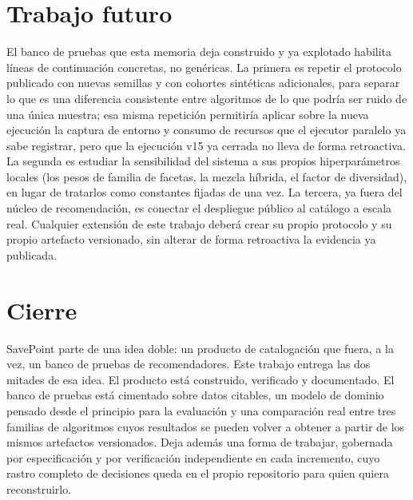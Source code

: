 \section{Trabajo futuro}\label{sec:conc-trabajo-futuro}

El banco de pruebas que esta memoria deja construido y ya explotado habilita líneas de
continuación concretas, no genéricas. La primera es repetir el protocolo publicado con nuevas
semillas y con cohortes sintéticas adicionales, para separar lo que es una diferencia
consistente entre algoritmos de lo que podría ser ruido de una única muestra; esa misma
repetición permitiría aplicar sobre la nueva ejecución la captura de entorno y consumo de
recursos que el ejecutor paralelo ya sabe registrar, pero que la ejecución v15 ya cerrada no
lleva de forma retroactiva. La segunda es estudiar la sensibilidad del sistema a sus propios
hiperparámetros locales (los pesos de familia de facetas, la mezcla híbrida, el factor de
diversidad), en lugar de tratarlos como constantes fijadas de una vez. La tercera, ya fuera
del núcleo de recomendación, es conectar el despliegue público al catálogo a escala real.
Cualquier extensión de este trabajo deberá crear su propio protocolo y su propio artefacto
versionado, sin alterar de forma retroactiva la evidencia ya publicada.

\section{Cierre}\label{sec:conc-cierre}

SavePoint parte de una idea doble: un producto de catalogación que fuera, a la vez, un banco
de pruebas de recomendadores. Este trabajo entrega las dos mitades de esa idea. El producto
está construido, verificado y documentado. El banco de pruebas está cimentado sobre datos
citables, un modelo de dominio pensado desde el principio para la evaluación y una comparación
real entre tres familias de algoritmos cuyos resultados se pueden volver a obtener a partir de
los mismos artefactos versionados. Deja además una forma de trabajar, gobernada
por especificación y por verificación independiente en cada incremento, cuyo rastro completo
de decisiones queda en el propio repositorio para quien quiera reconstruirlo.
